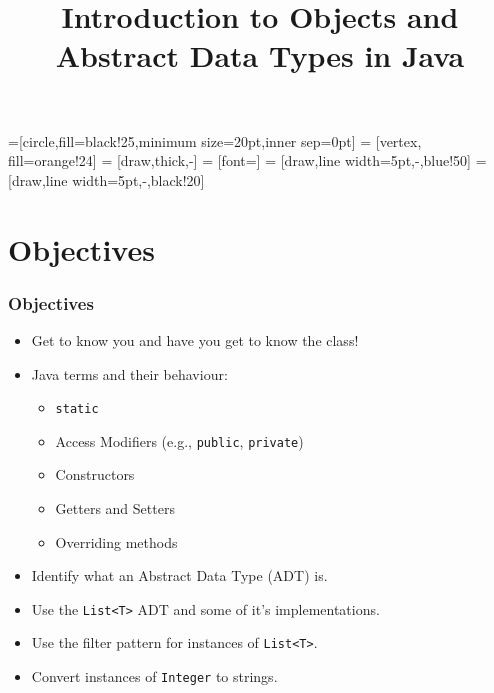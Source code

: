 \documentclass{beamer}
\title{\textbf{Introduction to Objects and Abstract Data Types in Java}}
\date{}
\begin{document}
=[circle,fill=black!25,minimum size=20pt,inner sep=0pt]
 = [vertex, fill=orange!24]
 = [draw,thick,-]
 = [font=\small]
 = [draw,line width=5pt,-,blue!50]
 = [draw,line width=5pt,-,black!20]


\frame{\titlepage}

\section{Objectives}
\begin{frame}
    \frametitle{Objectives}
    \begin{itemize}
        \item Get to know you and have you get to know the class!
        \item Java terms and their behaviour:
            \begin{itemize}
                \item \lstinline|static|
                \item Access Modifiers (e.g., \lstinline|public|, \lstinline|private|)
                \item Constructors
                \item Getters and Setters
                \item Overriding methods
            \end{itemize}
         \item Identify what an Abstract Data Type (ADT) is.
         \item Use the \lstinline|List<T>| ADT and some of it's implementations.
         \item Use the filter pattern for instances of \lstinline|List<T>|.
         \item Convert instances of \lstinline|Integer| to strings.
    \end{itemize}
\end{frame}
\end{document}
